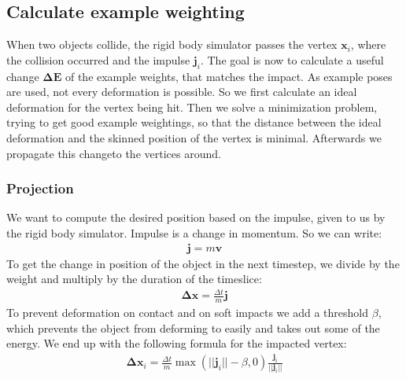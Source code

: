 \subsection{Calculate example weighting}
When two objects collide, the rigid body simulator passes the vertex $\bm{x}_i$, where the collision occurred and the impulse $\bm{j}_i$.
The goal is now to calculate a 	useful change $\bm{\Delta E}$ of the example weights, that matches the impact. As example poses are used, not every deformation is possible. So we first calculate an ideal deformation for the vertex being hit. Then we solve a minimization problem, trying to get good example weightings, so that the distance between the ideal deformation and the skinned position of the vertex is minimal. Afterwards we propagate this changeto the vertices around.
\subsubsection{Projection}
We want to compute the desired position based on the impulse, given to us by the rigid body simulator. Impulse is a change in momentum. So we can write:
\begin{align}
\bm j = m \bm v
\end{align}
To get the change in position of the object in the next timestep, we divide by the weight and multiply by the duration of the timeslice:
\begin{align}
\bm{\Delta x}= \frac{\Delta t}{m} \bm j
\end{align}
To prevent deformation on contact and on soft impacts we add a threshold $\beta$, which prevents the object from deforming to easily and takes out some of the energy. We end up with the following formula for the impacted vertex:
\begin{align}
\bm{\Delta x}_i = \frac{\Delta t}{m} \max(||\bm{j}_i|| - \beta, 0) \frac{\bm j_i}{||\bm j_i||}
\end{align}

